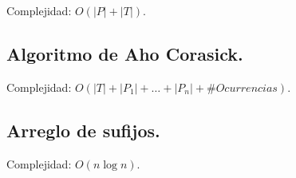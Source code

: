 \documentclass[10pt, letterpaper, twoside]{article}
\begin{document}
Complejidad: $O(|P| + |T|)$.



\subsection{Algoritmo de Aho Corasick.}

Complejidad: $O(|T| + |P_1| + \ldots + |P_n| + \#Ocurrencias)$.



\subsection{Arreglo de sufijos.}

Complejidad: $O(n\log n)$.


\end{document}
